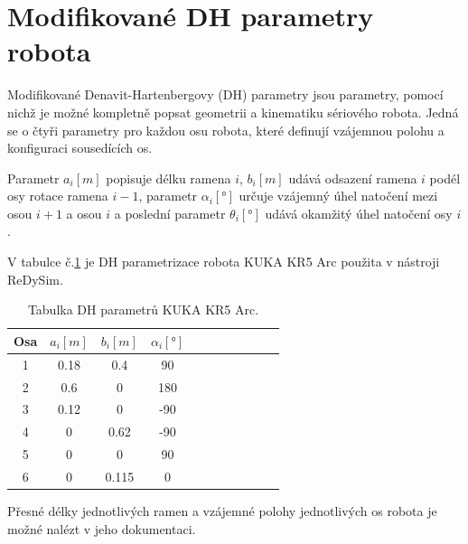 \section{Modifikované DH parametry robota}

Modifikované Denavit-Hartenbergovy (DH) parametry jsou parametry, pomocí nichž je možné kompletně popsat geometrii a kinematiku sériového robota. Jedná se o čtyři parametry pro každou osu robota, které definují vzájemnou polohu a konfiguraci sousedících os. 

Parametr $a_i [m]$ popisuje délku ramena $i$, $b_i [m]$ udává odsazení ramena $i$ podél osy rotace ramena $i-1$, parametr $\alpha_i [\si{\degree}]$ určuje vzájemný úhel natočení mezi osou $i+1$ a osou $i$ a poslední parametr $\theta_i [\si{\degree}]$ udává okamžitý úhel natočení osy $i$.

V tabulce č.\ref{tab_DH_kuka} je DH parametrizace robota KUKA KR5 Arc použita v nástroji ReDySim.

\begin{table}[htbp]
  \centering
  \caption{Tabulka DH parametrů KUKA KR5 Arc.}
    \begin{tabular}{c|cccccccccc}
    \multicolumn{1}{c|}{Osa} & \multicolumn{1}{c}{$a_{i} [m]$} & \multicolumn{1}{c}{$b_{i} [m]$} & \multicolumn{1}{c}{$\alpha_{i} [\si{\degree}]$} \\
    \hline
    1     &   0.18  &  0.4   &  90     &     \\
    2     &   0.6   &  0     &  180    &     \\
    3     &   0.12  &  0     &  -90    &     \\
    4     &   0     &  0.62  &  -90    &     \\
    5     &   0     &  0     &  90     &     \\
    6     &   0     &  0.115 &  0      &     \\
    \end{tabular}%
  \label{tab_DH_kuka}%
\end{table}%

Přesné délky jednotlivých ramen a vzájemné polohy jednotlivých os robota je možné nalézt v jeho dokumentaci.

